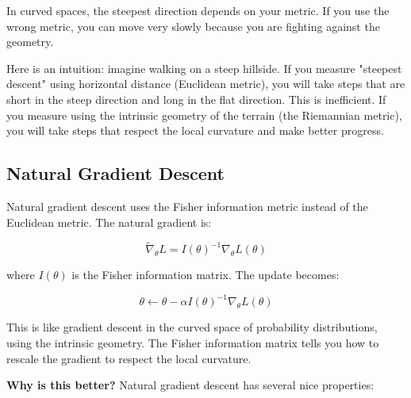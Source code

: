 \vspace{1em}

In curved spaces, the steepest direction depends on your metric. If you use the wrong metric, you can move very slowly because you are fighting against the geometry.

Here is an intuition: imagine walking on a steep hillside. If you measure "steepest descent" using horizontal distance (Euclidean metric), you will take steps that are short in the steep direction and long in the flat direction. This is inefficient. If you measure using the intrinsic geometry of the terrain (the Riemannian metric), you will take steps that respect the local curvature and make better progress.

\vspace{1.5em}

\subsection{Natural Gradient Descent}

Natural gradient descent uses the Fisher information metric instead of the Euclidean metric. The natural gradient is:

\begin{equation}
\tilde{\nabla}_\theta L = I(\theta)^{-1} \nabla_\theta L(\theta)
\end{equation}

where $I(\theta)$ is the Fisher information matrix. The update becomes:

\begin{equation}
\theta \leftarrow \theta - \alpha I(\theta)^{-1} \nabla_\theta L(\theta)
\end{equation}

\vspace{1em}

This is like gradient descent in the curved space of probability distributions, using the intrinsic geometry. The Fisher information matrix tells you how to rescale the gradient to respect the local curvature.

\vspace{1em}

\textbf{Why is this better?} Natural gradient descent has several nice properties:

